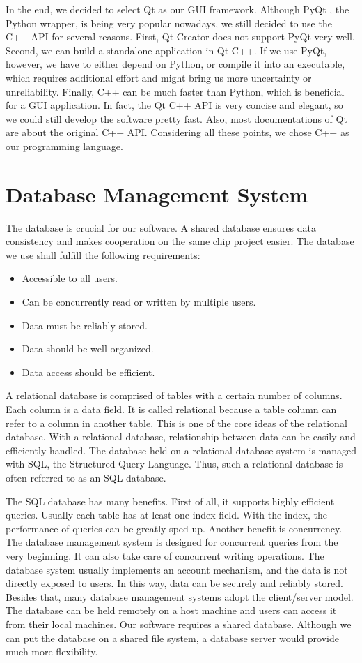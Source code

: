 In the end, we decided to select Qt as our GUI framework. Although PyQt \cite{pyqt}, the Python wrapper, is being very popular nowadays, we still decided to use the C++ API for several reasons. First, Qt Creator does not support PyQt very well. Second, we can build a standalone application in Qt C++. If we use PyQt, however, we have to either depend on Python, or compile it into an executable, which requires additional effort and might bring us more uncertainty or unreliability. Finally, C++ can be much faster than Python, which is beneficial for a GUI application. In fact, the Qt C++ API is very concise and elegant, so we could still develop the software pretty fast. Also, most documentations of Qt are about the original C++ API. Considering all these points, we chose C++ as our programming language.

\section{Database Management System}
The database is crucial for our software. A shared database ensures data consistency and makes cooperation on the same chip project easier. The database we use shall fulfill the following requirements:
\begin{itemize}
\item Accessible to all users.
\item Can be concurrently read or written by multiple users.
\item Data must be reliably stored.
\item Data should be well organized.
\item Data access should be efficient.
\end{itemize}

A relational database is comprised of tables with a certain number of columns. Each column is a data field. It is called relational because a table column can refer to a column in another table. This is one of the core ideas of the relational database. With a relational database, relationship between data can be easily and efficiently handled. The database held on a relational database system is managed with SQL, the Structured Query Language. Thus, such a relational database is often referred to as an SQL database.

The SQL database has many benefits. First of all, it supports highly efficient queries. Usually each table has at least one index field. With the index, the performance of queries can be greatly sped up. Another benefit is concurrency. The database management system is designed for concurrent queries from the very beginning. It can also take care of concurrent writing operations. The database system usually implements an account mechanism, and the data is not directly exposed to users. In this way, data can be securely and reliably stored. Besides that, many database management systems adopt the client/server model. The database can be held remotely on a host machine and users can access it from their local machines. Our software requires a shared database. Although we can put the database on a shared file system, a database server would provide much more flexibility.

